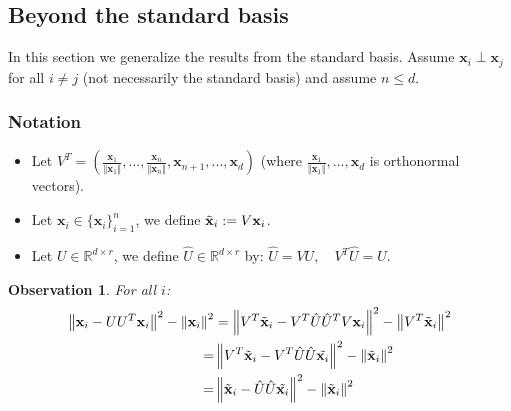 \documentclass{article}
\newtheorem{observation}{Observation}
\newcommand{\x}{{\mathbf x}}
\newcommand{\norm}[1]{\left\Vert #1\right\Vert}
\begin{document}
\subsection{Beyond the standard basis}

In this section we generalize the results from the standard basis. Assume $\x_i\perp \x_j$ for all $i\ne j$ (not necessarily the standard basis) and assume $n\le d$. 

\subsubsection{Notation}
\begin{itemize}
    \item Let $V^T=\left(\frac{\x_1}{\Vert \x_1\Vert},...,\frac{\x_n}{\Vert \x_n\Vert}, \x_{n+1},...,\x_d\right)$ (where $\frac{\x_1}{\Vert \x_1\Vert},...,\x_d$ is orthonormal vectors).
    \item Let $\x_i\in\{\x_i\}_{i=1}^n$, we define $\Tilde{\x}_i:=V\x_i$. 
    \item Let  $U\in\mathbb{R}^{d\times r}$, we define $\hat{U}\in\mathbb{R}^{d\times r}$ by: $\hat{U}=VU,\quad V^T\hat{U}=U$.
\end{itemize}

\begin{observation}
For all $i$:
\begin{align*}
    \norm{\x_i-UU^T\x_i}^2-\norm{\x_i}^2&=\norm{V^T\Tilde{\x}_i-V^T\hat{U}\hat{U}^TV\x_i}^2- \norm{V^T\Tilde{\x}_i}^2\\
    =&\norm{V^T\Tilde{\x}_i-V^T\hat{U}\hat{U}\Tilde{\x_i}}^2-\norm{\Tilde{\x}_i}^2\\
    =&\norm{\Tilde{\x}_i-\hat{U}\hat{U}\Tilde{\x_i}}^2- \norm{\Tilde{\x}_i}^2
\end{align*}
\end{observation}
\end{document}
